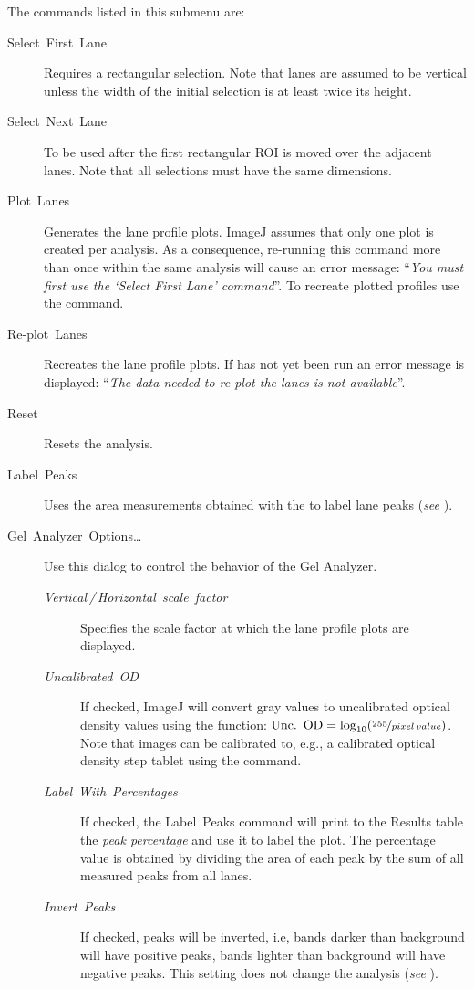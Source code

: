 The commands listed in this submenu are:
\begin{description}
\item [{Select\ First\ Lane\ \textmd{}}] Requires
a rectangular selection. Note that lanes are assumed to be vertical
unless the width of the initial selection is at least twice its height.
\item [{Select\ Next\ Lane\ \textmd{}}] To be used
after the first rectangular ROI is moved over the adjacent lanes.
Note that all selections must have the same dimensions.
\item [{Plot\ Lanes\ \ \textmd{}}] Generates the lane
profile plots. ImageJ assumes that only one plot is created per analysis.
As a consequence, re-running this command more than once within the
same analysis will cause an error message: ``\emph{You must first
use the `Select First Lane' command}''. To recreate plotted profiles
use the  command.
\item [{Re-plot\ Lanes}] Recreates the lane profile plots. If 
has not yet been run an error message is displayed: ``\emph{The data
needed to re-plot the lanes is not available}''.
\item [{Reset}] Resets the analysis.
\item [{Label\ Peaks}] Uses the area measurements obtained with the 
to label lane peaks (\emph{see} ).
\item [{Gel\ Analyzer\ Options\ldots{}}] Use this dialog to control
the behavior of the Gel Analyzer.

\begin{description}
\item [{\emph{Vertical\,/\,Horizontal\ scale\ factor}}] Specifies the
scale factor at which the lane profile plots are displayed. 
\item [{\emph{Uncalibrated\ OD}}] If checked, ImageJ will convert gray
values to uncalibrated optical density values using the function:
$\mbox{Unc.\,\ OD}=\log_{10}(\nicefrac{255}{pixel\, value})$. Note
that images can be calibrated to, e.g., a calibrated optical density
step tablet using the 
command.
\item [{\emph{Label}\ \emph{With}\ \emph{Percentages}}] If checked, the
Label\ Peaks command will print to the Results table the \emph{peak
percentage} and use it to label the plot. The percentage value is
obtained by dividing the area of each peak by the sum of all measured
peaks from all lanes.
\item [{\emph{Invert}\ \emph{Peaks}}] If checked, peaks will be inverted,
i.e, bands darker than background will have positive peaks, bands
lighter than background will have negative peaks. This setting does
not change the analysis (\emph{see} ).
\end{description}
\end{description}

